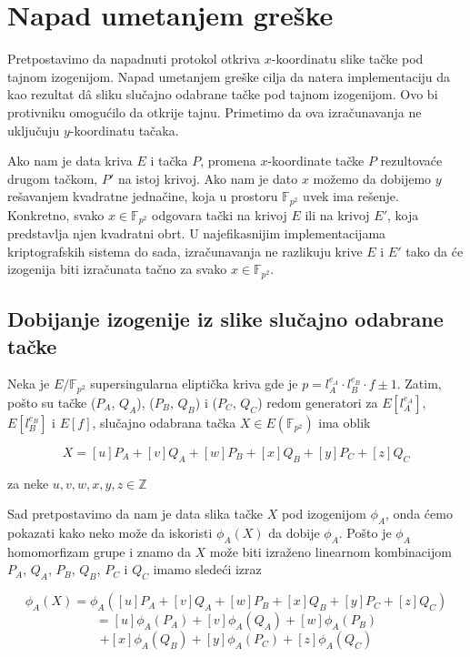 \documentclass[a4paper]{article}
\begin{document}
\section{Napad umetanjem greške}

Pretpostavimo da napadnuti protokol otkriva $x$-koordinatu slike tačke pod tajnom izogenijom. Napad umetanjem greške cilja da natera implementaciju da kao rezultat d\^ a sliku slučajno odabrane tačke pod tajnom izogenijom. Ovo bi protivniku omogućilo da otkrije tajnu. Primetimo da ova izračunavanja ne uključuju $y$-koordinatu tačaka. 

Ako nam je data kriva $E$ i tačka $P$, promena $x$-koordinate tačke $P$ rezultovaće drugom tačkom, $P'$ na istoj krivoj. Ako nam je dato $x$ možemo da dobijemo $y$ rešavanjem kvadratne jednačine, koja u prostoru $\mathbb{F}_{p^2}$ uvek ima rešenje. Konkretno, svako $x \in \mathbb{F}_{p^2}$ odgovara tački na krivoj $E$ ili na krivoj $E'$, koja predstavlja njen kvadratni obrt. U najefikasnijim implementacijama kriptografskih sistema do sada, izračunavanja ne razlikuju krive $E$ i $E'$ tako da će izogenija biti izračunata tačno za svako $x \in \mathbb{F}_{p^2}$. 


\subsection{Dobijanje izogenije iz slike slučajno odabrane tačke}

Neka je $E/\mathbb{F}_{p^2}$ supersingularna eliptička kriva gde je  $p = l^{e_A}_{A} \cdot l^{e_B}_{B} \cdot f \pm 1$. Zatim, pošto su tačke ($P_A$, $Q_A$), ($P_B$, $Q_B$) i
($P_C$, $Q_C$) redom generatori za $E[l^{e_A}_{A}]$, $E[l^{e_B}_{B}]$ i $E[f]$, slučajno odabrana tačka $X \in E(\mathbb{F}_{p^2})$ ima oblik

$$X = [u]P_A + [v]Q_A + [w]P_B + [x]Q_B + [y]P_C + [z]Q_C$$

\noindent za neke $u, v, w, x, y, z \in \mathbb{Z}$

Sad pretpostavimo da nam je data slika tačke $X$ pod izogenijom $\phi_A$, onda ćemo pokazati kako neko može da iskoristi $\phi_A(X)$ da dobije $\phi_A$. Pošto je $\phi_A$ homomorfizam grupe i znamo da $X$ može biti izraženo linearnom kombinacijom  $P_A$, $Q_A$, $P_B$, $Q_B$, $P_C$ i $Q_C$ imamo sledeći izraz

$$\phi_A(X) = \phi_A([u]P_A + [v]Q_A + [w]P_B + [x]Q_B + [y]P_C + [z]Q_C) $$
$$= [u]\phi_A(P_A) + [v]\phi_A(Q_A) + [w]\phi_A(P_B) $$
$$+ [x]\phi_A(Q_B) + [y]\phi_A(P_C) + [z]\phi_A(Q_C)$$
\end{document}
